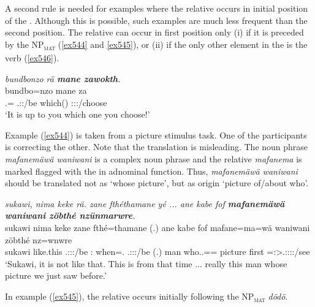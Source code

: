A second rule is needed for examples where the relative  occurs in initial position of the . Although this is possible, such examples are much less frequent than the second position. The relative  can occur in first position only (i) if it is preceded by the NP\textsubscript{\textsc{mat}} (\ref{ex544} and \ref{ex545}), or (ii) if the only other element in the  is the verb (\ref{ex546}).

\begin{exe}
	\ex \emph{bundbonzo rä \textbf{mane zawokth}.}\\
	\gll bundbo=nzo  mane za\\
	\Ssg.\All={\Only} \Tsg.\F:\Nonpast:\Ipfv/be which(\Abs) \Ssg:\Sbj:\Imp:\Pfv/choose\\
	\trans `It is up to you which one you choose!'
	\label{ex546}
\end{exe}

Example (\ref{ex544}) is taken from a picture stimulus task. One of the participants is correcting the other. Note that the  translation is misleading. The noun phrase \emph{mafanemäwä waniwani} is a complex noun phrase and the relative  \emph{mafanema} is marked flagged with the   in adnominal function. Thus, \emph{mafanemäwä waniwani} should be translated not as  `whose picture', but as origin `picture of/about who'.

\begin{exe}
	\ex \emph{sukawi, nima keke rä. zane fthéthamane yé ... ane kabe fof \textbf{mafanemäwä waniwani zöbthé nzünmarwre}.}\\
	\gll sukawi nima keke  zane fthé=thamane  (.) ane kabe fof mafane=ma=wä waniwani zöbthé nz=wnwre\\
	sukawi {like.this} {\Neg} \Tsg.\F:\Sbj:\Nonpast:\Ipfv/be \Dem:{\Prox} when=\Temp.{\Poss} \Tsg.\Masc:\Sbj:\Nonpast:\Ipfv/be (.) {\Dem} man {\Emph} who.\Sg.\Poss=\Char={\Emph} picture first \Immpst=\Fpl:\Sbj>\Tsg.\F:\Obj:\Nonpast:\Ipfv:\Venit/see\\
	\trans `Sukawi, it is not like that. This is from that time ... really this man whose picture we just saw before.'
	\label{ex544}
\end{exe}

In example (\ref{ex545}), the relative  occurs initially following the NP\textsubscript{\textsc{mat}} \emph{dödö}.

